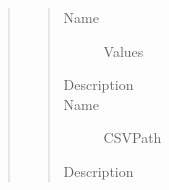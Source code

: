 \documentclass[letterpaper,10pt,english]{sphinxmanual}
\begin{document}
\begin{quote}
\begin{description}
\begin{quote}
\begin{description}
\item[{Name}] \leavevmode
Values

\item[{Description}] \leavevmode
{}

\item[{Name}] \leavevmode
CSVPath

\item[{Description}] \leavevmode
{}

\end{description}\end{quote}

\end{description}\end{quote}
\end{document}
